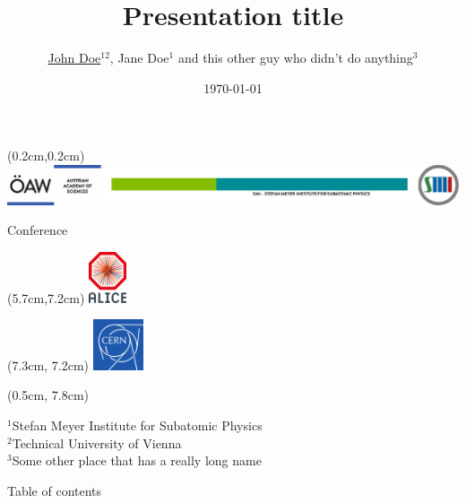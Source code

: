 \documentclass[9pt, aspectratio=169]{beamer}
\author{\underline{John Doe$^{12}$}, Jane Doe$^1$ and this other guy who didn't do anything$^3$}
\title{Presentation title}
\date{\scriptsize \today}
\newcommand{\conference}{\scriptsize Conference}
\begin{document}
\begin{frame}[plain]
    \begin{textblock*}{\textwidth}(0.2cm,0.2cm)
        \includegraphics[width=1.015\textwidth]{smi-template/oeaw-smi-logos.pdf}
    \end{textblock*}
    \vspace{0.8cm}
    \begin{center}
        {\large \bfseries \color{OEAWblue} \inserttitle\par}
        \vspace{1cm}
        
        {\insertauthor\par}
        \vspace{1cm}
        
        {\insertdate\par}
        \conference
        \begin{textblock*}{\textwidth}(5.7cm,7.2cm)
            \includegraphics[height=1.5cm]{smi-template/more-logos/alice-logo.png}
        \end{textblock*}
        \begin{textblock*}{\textwidth}(7.3cm, 7.2cm)
            \includegraphics[height=1.5cm]{smi-template/more-logos/cern-logo.png}
        \end{textblock*}

    \begin{textblock*}{\textwidth}(0.5cm, 7.8cm)
        \raggedright
        $^1$Stefan Meyer Institute for Subatomic Physics\\
        $^2$Technical University of Vienna\\
        $^3$Some other place that has a really long name
    \end{textblock*}
    \end{center}
\end{frame}
\begin{frame}{Table of contents}
\tableofcontents[sectionstyle=show,
subsectionstyle=show/shaded/hide,
subsubsectionstyle=show/shaded/hide]
\end{frame}
\end{document}
